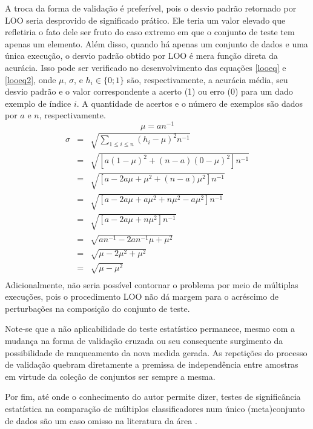 A troca da forma de validação é preferível, pois o desvio padrão retornado por LOO seria desprovido de significado prático.
Ele teria um valor elevado que refletiria o fato dele ser fruto do caso extremo em que o conjunto de teste tem apenas um elemento.
Além disso, quando há apenas um conjunto de dados e uma única execução, o desvio padrão obtido por LOO é mera função direta da acurácia.
Isso pode ser verificado no desenvolvimento das equações \ref{looeq} e \ref{looeq2}, onde $\mu$, $\sigma$, e $h_i \in \{0;1\}$ são, respectivamente, a acurácia média, seu desvio padrão e o valor correspondente a acerto (1) ou erro (0) para um dado exemplo de índice $i$.
A quantidade de acertos e o número de exemplos são dados por $a$ e $n$, respectivamente.
\begin{equation}\label{looeq}\mu = an^{-1} \end{equation}
\begin{equation}\label{looeq2}\begin{array} {lcl}
\sigma & = & \sqrt{\sum\limits_{1\leq i \leq n}(h_i - \mu)^2 n^{-1}} \\
&=&\sqrt{[a(1 - \mu)^2 + (n-a)(0 - \mu)^2] n^{-1}} \\
&=&\sqrt{[a - 2a\mu + \mu^2 + (n-a)\mu^2] n^{-1}} \\
&=&\sqrt{[a - 2a\mu + a\mu^2 + n\mu^2-a\mu^2] n^{-1}} \\
&=&\sqrt{[a - 2a\mu + n\mu^2] n^{-1}} \\
&=&\sqrt{an^{-1} - 2an^{-1}\mu + \mu^2} \\
&=&\sqrt{\mu - 2\mu^2 + \mu^2} \\
&=&\sqrt{\mu - \mu^2} \\
\end{array}\end{equation}
Adicionalmente, não seria possível contornar o problema por meio de múltiplas execuções, pois o procedimento LOO não dá margem para o acréscimo de perturbações na composição do conjunto de teste.

Note-se que a não aplicabilidade do teste estatístico permanece, mesmo com a mudança na forma de validação cruzada ou seu consequente surgimento da possibilidade de ranqueamento da nova medida gerada.
As repetições do processo de validação quebram diretamente a premissa de independência entre amostras em virtude da coleção de conjuntos ser sempre a mesma.

Por fim, até onde o conhecimento do autor permite dizer, testes de significância estatística na comparação de múltiplos classificadores num único (meta)conjunto de dados são um caso omisso na literatura da área \cite{santafe2015dealing,books/cu/Japkowicz2011}.

